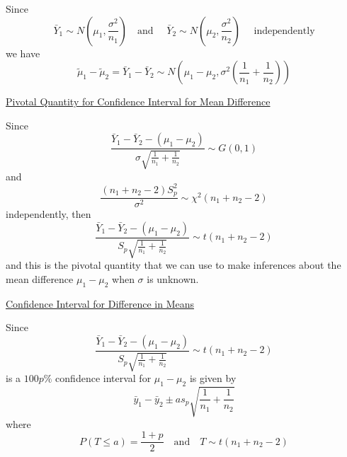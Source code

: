 Since
\[\bar{Y}_{1} \sim N\left(\mu_{1}, \frac{\sigma^{2}}{n_{1}}\right) \quad \text{and } \quad \bar{Y}_{2} \sim N\left(\mu_{2}, \frac{\sigma^{2}}{n_{2}}\right) \quad \text{ independently}\]
we have
\[\tilde{\mu}_{1}-\tilde{\mu}_{2}=\bar{Y}_{1}-\bar{Y}_{2}
    \sim N\left(\mu_{1}-\mu_{2}, \sigma^{2}\left(\frac{1}{n_{1}}+\frac{1}{n_{2}}\right)\right)\]

\underline{Pivotal Quantity for Confidence Interval for Mean Difference}

Since
\[\frac{\bar{Y}_{1}-\bar{Y}_{2}-\left(\mu_{1}-\mu_{2}\right)}{\sigma \sqrt{\frac{1}{n_{1}}+\frac{1}{n_{2}}}} \sim G(0,1)\]
and
\[\frac{\left(n_{1}+n_{2}-2\right) S_{p}^{2}}{\sigma^{2}} \sim \chi^{2}\left(n_{1}+n_{2}-2\right)\]
independently, then
\[\frac{\bar{Y}_{1}-\bar{Y}_{2}-\left(\mu_{1}-\mu_{2}\right)}{S_{p} \sqrt{\frac{1}{n_{1}}+\frac{1}{n_{2}}}} \sim t\left(n_{1}+n_{2}-2\right)\]
and this is the pivotal quantity that we can use to make inferences about the mean difference
$ \mu_1-\mu_2 $ when $ \sigma $ is unknown.

\underline{Confidence Interval for Difference in Means}

Since
\[\frac{\bar{Y}_{1}-\bar{Y}_{2}-\left(\mu_{1}-\mu_{2}\right)}{S_{p} \sqrt{\frac{1}{n_{1}}+\frac{1}{n_{2}}}} \sim t\left(n_{1}+n_{2}-2\right)\]
is a $ 100p\% $ confidence interval for $ \mu_1-\mu_2 $ is given by
\[\bar{y}_{1}-\bar{y}_{2} \pm a s_{p} \sqrt{\frac{1}{n_{1}}+\frac{1}{n_{2}}}\]
where
\[P(T \leq a)=\frac{1+p}{2} \quad \text{and} \quad T \sim t\left(n_{1}+n_{2}-2\right)\]

